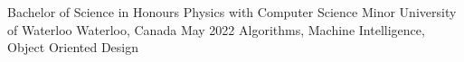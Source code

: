 
\begin{cventries}
  \cventry
    {Bachelor of Science in Honours Physics with Computer Science Minor} %
    {University of Waterloo} %
    {Waterloo, Canada} %
    {May 2022} %
    {Algorithms, Machine Intelligence, Object Oriented Design}
\end{cventries}
